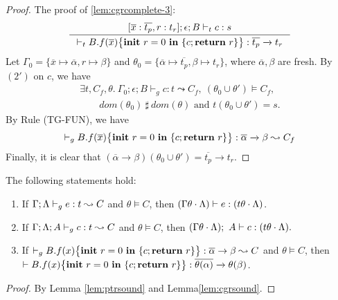 {{{\begin{proof}
The proof of \ref{lem:cgrcomplete-3}: \\
\begin{equation*}
\inference
{[\overline{x}: \overline{t_p},\lpRES:t_r];\epsilon; B \vdash_{t} c : s }
{\vdash_{t} \lpPROG{B.f}{\overline{x}}{c}{\lpRES} :  \overline{t_p}\xrightarrow{} t_r}
\end{equation*}
Let $\Gamma_{0} = \{\overline{x} \mapsto \overline{\alpha}, r\mapsto \beta \} $
and $\theta_{0} = \{\overline{\alpha}\mapsto \overline{t_p}, \beta\mapsto t_r\} $,
where $\overline{\alpha},\beta$ are fresh.
By $(2')$ on $c$, we have
\begin{equation*}
\begin{array}{l}
\exists t, C_f, \theta .~ \Gamma_{0};\epsilon; B \vdash_{g} c : t\leadsto C_f,~ (\theta_{0}\cup\theta')\vDash C_f,\\
\quad\quad dom(\theta_{0}) ~\sharp~ dom(\theta) \textrm{ and } t(\theta_{0}\cup\theta') = s.
\end{array}
\end{equation*}
By Rule {(TG-FUN)}, we have
\begin{gather*}
\vdash_{g} {B.f}(\overline{x})\big\{{{\textbf{init}~ {r}=0 ~\textbf{in}~\{{c};\textbf{return}~{r}\}}}\big\} :  \overline{\alpha}\xrightarrow{} \beta\leadsto C_f
\end{gather*}
Finally, it is clear that $(\overline{\alpha}\xrightarrow{} \beta) (\theta_{0}\cup\theta' ) = \overline{t_p}\xrightarrow{} t_r$.
\end{proof}

\begin{lemma}\label{lem:cgrsound0}
The following statements hold:
\begin{enumerate}[label={(\alph*)}]
\item\label{lem:cgrsound0-1} If $\Gamma;\Lambda \vdash_{g} e : t\leadsto C$ and $\theta \vDash C$, then $(\Gamma\theta\cdot\Lambda) \vdash e : (t\theta\cdot\Lambda) $.

\item\label{lem:cgrsound0-2} If $\Gamma;\Lambda; A \vdash_{g} c : t\leadsto C$ and $\theta \vDash C$,
then  $(\Gamma\theta\cdot\Lambda);~A \vdash c : (t\theta\cdot\Lambda).$

\item\label{lem:cgrsound0-3} If $ \vdash_{g} {B.f}(x)\big\{{{\textbf{init}~ {r}=0 ~\textbf{in}~\{{c};\textbf{return}~{r}\}}}\big\} :  \overline{\alpha}\rightarrow \beta\leadsto C$ and $\theta \vDash C$, then
$\vdash {B.f}(x)\big\{{{\textbf{init}~ {r}=0 ~\textbf{in}~\{{c};\textbf{return}~{r}\}}}\big\} : \overline{\theta(\alpha)}\xrightarrow{}\theta(\beta)$.

\end{enumerate}
\end{lemma}
\begin{proof}
By Lemma \ref{lem:ptrsound} and Lemma\ref{lem:cgrsound}.
\end{proof}

}}}
